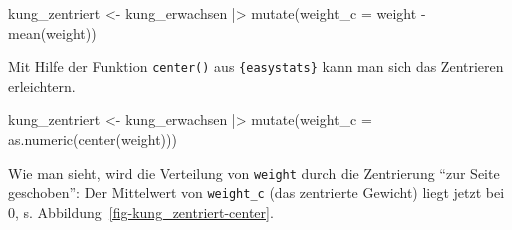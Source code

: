 \documentclass[
  ngerman,
  letterpaper,
  twoside,
  open=any]{scrbook}
\newenvironment{Shaded}{\begin{snugshade}}{\end{snugshade}}
\newcommand{\AttributeTok}[1]{\textcolor[rgb]{0.40,0.45,0.13}{#1}}
\newcommand{\FunctionTok}[1]{\textcolor[rgb]{0.28,0.35,0.67}{#1}}
\newcommand{\NormalTok}[1]{\textcolor[rgb]{0.00,0.23,0.31}{#1}}
\newcommand{\OtherTok}[1]{\textcolor[rgb]{0.00,0.23,0.31}{#1}}
\newcommand{\SpecialCharTok}[1]{\textcolor[rgb]{0.37,0.37,0.37}{#1}}
\theoremstyle{definition}
\theoremstyle{plain}
\theoremstyle{definition}
\theoremstyle{definition}
\theoremstyle{definition}
\theoremstyle{definition}
\theoremstyle{remark}
\begin{document}
\begin{Shaded}
\begin{Highlighting}[]
\NormalTok{kung\_zentriert }\OtherTok{\textless{}{-}}
\NormalTok{  kung\_erwachsen }\SpecialCharTok{|\textgreater{}} 
  \FunctionTok{mutate}\NormalTok{(}\AttributeTok{weight\_c =}\NormalTok{ weight }\SpecialCharTok{{-}} \FunctionTok{mean}\NormalTok{(weight))}
\end{Highlighting}
\end{Shaded}

Mit Hilfe der Funktion \texttt{center()} aus \texttt{\{easystats\}} kann
man sich das Zentrieren erleichtern.

\begin{Shaded}
\begin{Highlighting}[]
\NormalTok{kung\_zentriert }\OtherTok{\textless{}{-}} 
\NormalTok{  kung\_erwachsen }\SpecialCharTok{|\textgreater{}} 
  \FunctionTok{mutate}\NormalTok{(}\AttributeTok{weight\_c =} \FunctionTok{as.numeric}\NormalTok{(}\FunctionTok{center}\NormalTok{(weight)))}
\end{Highlighting}
\end{Shaded}

\begin{table}

\caption{\label{tbl-kung-zentriert}Gewicht (\texttt{weight}) und
zentriertes Gewicht (\texttt{weight\_c}): Zentrierte Gewichtswerte
zeigen, wie viele Kilogramm eine Person vom Mittelwert entfernt ist. So
ist die Person mit der ID 1 drei Kilogramm schwerer als der Mittelwert
von 45 kg.}


\end{table}%

Wie man sieht, wird die Verteilung von \texttt{weight} durch die
Zentrierung \enquote{zur Seite geschoben}: Der Mittelwert von
\texttt{weight\_c} (das zentrierte Gewicht) liegt jetzt bei 0, s.
Abbildung~\ref{fig-kung_zentriert-center}.
\end{document}

